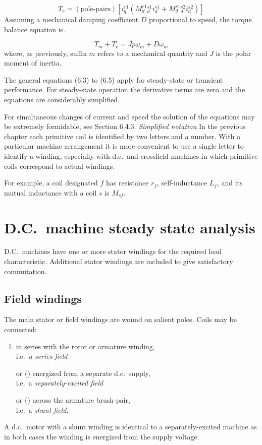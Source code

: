 \documentclass[a4paper,numbers=noenddot,12pt]{scrbook}
\begin{document}
\begin{equation}
    T_e = (\text{pole-pairs})[i_q^{r1}(M_d^{r1}{}_d^{s1} i_d^{s1} + M_d^{r1}{}_d^{s2} i_d^{s2})]
    \label{}
\end{equation}
Assuming a mechanical damping coefficient $D$ proportional to speed, the torque balance equation is.

\begin{equation}
    T_m + T_e = J p \omega_m + D \omega_m
    \label{}
\end{equation}
where, as previously, suffix $m$ refers to a mechanical quantity and $J$ is the polar moment of inertia.

The general equations (6.3) to (6.5) apply for steady-state or transient performance. For steady-state operation the derivative terms are zero and the equations are considerably simplified.

For simultaneous changes of current and speed the solution of the equations may be extremely formidable, see Section 6.4.3.
\noindent \textit{Simplified notation} In the previous chapter each primitive coil is identified by two letters and a number. With a particular machine arrangement it is more convenient to use a single letter to identify a winding, especially with d.c.\ and crossfield machines in which primitive coils correspond to actual windings.

For example, a coil designated $f$ has resistance $r_f$, self-inductance $L_f$, and its mutual inductance with a coil $s$ is $M_{sf}$.

\section{D.C.\ machine steady state analysis}
D.C.\ machines have one or more stator windings for the required load characteristic. Additional stator windings are included to give satisfactory commutation.

\subsection{Field windings} The main stator or field windings are wound on salient poles. Coils may be connected:
\begin{enumerate}[label ={(\alph*)}]
    \item in series with the rotor or armature winding, \\
        i.e.\ \textit{a series field}
    \item[or \stepcounter{enumi} (\alph{enumi})] energized from a separate d.c.\ supply, \\
        i.e.\ a \textit{separately-excited field}
    \item[or \stepcounter{enumi} (\alph{enumi})] across the armature brush-pair,\\
        i.e.\ a \textit{shunt field.}
\end{enumerate}
A d.c.\ motor with a shunt winding is identical to a separately-excited machine as in both cases the winding is energized from the supply voltage.
\end{document}
